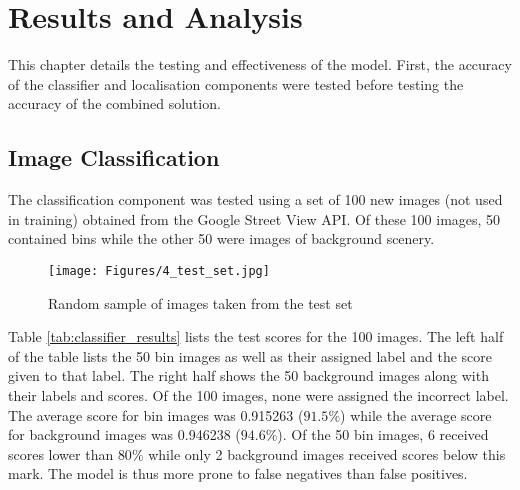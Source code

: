 \chapter{Results and Analysis}
\label{results}
This chapter details the testing and effectiveness of the model. First, the accuracy of the classifier and localisation components were tested before testing the accuracy of the combined solution.

\section{Image Classification}
The classification component was tested using a set of 100 new images (not used in training) obtained from the Google Street View API. Of these 100 images, 50 contained bins while the other 50 were images of background scenery.

\begin{figure}[H]
\centering
\texttt{[image: Figures/4\_test\_set.jpg]}
\decoRule
\caption[Testing Set]{Random sample of images taken from the test set}
\label{fig:test_set}
\end{figure}

Table \ref{tab:classifier_results} lists the test scores for the 100 images. The left half of the table lists the 50 bin images as well as their assigned label and the score given to that label. The right half shows the 50 background images along with their labels and scores. Of the 100 images, none were assigned the incorrect label. The average score for bin images was 0.915263 ($91.5\%$) while the average score for background images was 0.946238 ($94.6\%$). Of the 50 bin images, 6 received scores lower than $80\%$ while only 2 background images received scores below this mark. The model is thus more prone to false negatives than false positives.

